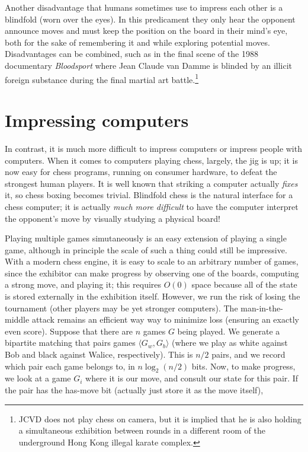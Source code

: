 \documentclass[twocolumn]{amsart}
\begin{document}
Another disadvantage that humans sometimes use to impress each other
is a blindfold (worn over the eyes). In this predicament they only
hear the opponent announce moves and must keep the position on the
board in their mind's eye, both for the sake of remembering it and
while exploring potential moves.
Disadvantages can be combined, such as in the final scene of the 1988
documentary {\it Bloodsport} where Jean Claude van Damme is blinded by
an illicit foreign substance during the final martial art
battle.\footnote{JCVD does not play chess on camera, but it is implied
  that he is also holding a simultaneous exhibition between rounds in
  a different room of the underground Hong Kong illegal karate
  complex.}

\section{Impressing computers}

In contrast, it is much more difficult to impress computers or impress
people with computers. When it comes to computers playing chess,
largely, the jig is up; it is now easy for chess programs, running on
consumer hardware, to defeat the strongest human players. It is well
known that striking a computer actually {\em fixes} it, so chess
boxing becomes trivial. Blindfold chess is the natural interface for a
chess computer; it is actually {\em much more difficult} to have the
computer interpret the opponent's move by visually studying a physical
board!

Playing multiple games simutaneously is an easy extension of playing a
single game, although in principle the scale of such a thing could
still be impressive. With a modern chess engine, it is easy to scale
to an arbitrary number of games, since the exhibitor can make progress
by observing one of the boards, computing a strong move, and playing
it; this requires $O(0)$ space because all of the state is stored
externally in the exhibition itself. 
However, we run the risk of losing the tournament (other players may
be yet stronger computers). The man-in-the-middle attack remains an
efficient way way to minimize loss (ensuring an exactly even score).
Suppose that there are $n$ games $G$ being played. We generate a
bipartite matching that pairs games $\langle G_w, G_b \rangle$ (where
we play as white against Bob and black against Walice, respectively).
This is $n/2$ pairs, and we record which pair each game belongs to, in
$n \log_2(n/2)$ bits. Now, to make progress, we look at a game $G_i$
where it is our move, and consult our state for this pair. If the
pair has the has-move bit (actually just store it as the move itself), 
\end{document}
